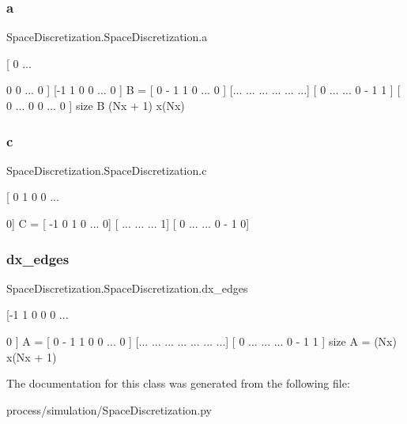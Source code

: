 \subsubsection{\texorpdfstring{a}{a}}
{\footnotesize\ttfamily Space\+Discretization.\+Space\+Discretization.\+a}



\mbox{[} 0 ... 

0 0 ... 0 \mbox{]} \mbox{[}-\/1 1 0 0 ... 0 \mbox{]} B = \mbox{[} 0 -\/ 1 1 0 ... 0 \mbox{]} \mbox{[}... ... ... ... ... ...\mbox{]} \mbox{[} 0 ... ... 0 -\/ 1 1 \mbox{]} \mbox{[} 0 ... 0 0 ... 0 \mbox{]} size B (Nx + 1) x(\+Nx) \hypertarget{class_space_discretization_1_1_space_discretization_abdcfc72586714aff94e58dfbe1a91f6d}{}\label{class_space_discretization_1_1_space_discretization_abdcfc72586714aff94e58dfbe1a91f6d} 
\subsubsection{\texorpdfstring{c}{c}}
{\footnotesize\ttfamily Space\+Discretization.\+Space\+Discretization.\+c}



\mbox{[} 0 1 0 0 ... 

0\mbox{]} C = \mbox{[} -\/1 0 1 0 ... 0\mbox{]} \mbox{[} ... ... ... 1\mbox{]} \mbox{[} 0 ... ... 0 -\/ 1 0\mbox{]} \hypertarget{class_space_discretization_1_1_space_discretization_a1a9a27f1f3c729cc06b517b806b8549b}{}\label{class_space_discretization_1_1_space_discretization_a1a9a27f1f3c729cc06b517b806b8549b} 
\subsubsection{\texorpdfstring{dx\+\_\+edges}{dx\_edges}}
{\footnotesize\ttfamily Space\+Discretization.\+Space\+Discretization.\+dx\+\_\+edges}



\mbox{[}-\/1 1 0 0 0 ... 

0 \mbox{]} A = \mbox{[} 0 -\/ 1 1 0 0 ... 0 \mbox{]} \mbox{[}... ... ... ... ... ... ...\mbox{]} \mbox{[} 0 ... ... ... 0 -\/ 1 1 \mbox{]} size A = (Nx) x(Nx + 1) 

The documentation for this class was generated from the following file\+:\begin{DoxyCompactItemize}
\item 
process/simulation/Space\+Discretization.\+py\end{DoxyCompactItemize}
